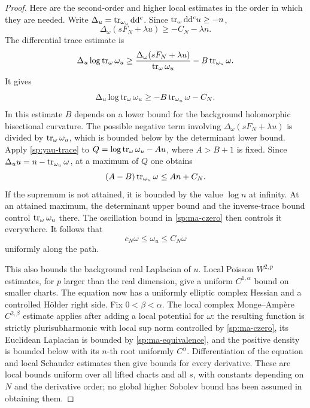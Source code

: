 \begin{proof}
Here are the second-order and higher local estimates in the order in
which they are needed.  Write $\Delta_u=\operatorname{tr}_{\omega_u}\mathrm d\mathrm d^c$.
Since $\operatorname{tr}_\omega\mathrm d\mathrm d^c u\ge-n$,
\[
 \Delta_\omega(sF_N+\lambda u)\ge-C_N-\lambda n.
\]
The differential trace estimate
\cite[Lemma~2.2]{CampanaGuenanciaPaun2013} is
\[
 \Delta_u\log\operatorname{tr}_\omega\omega_u
 \ge\frac{\Delta_\omega(sF_N+\lambda u)}
            {\operatorname{tr}_\omega\omega_u}
       -B\operatorname{tr}_{\omega_u}\omega.
\]
It gives
\begin{equation}\label{sp:yau-trace}
 \Delta_u\log\operatorname{tr}_\omega\omega_u
 \ge-B\operatorname{tr}_{\omega_u}\omega-C_N.
\end{equation}
In this estimate $B$ depends on a lower bound for the background
holomorphic bisectional curvature.  The possible negative term involving
$\Delta_\omega(sF_N+\lambda u)$ is divided by
$\operatorname{tr}_\omega\omega_u$, which is bounded below by the determinant lower
bound.
Apply \eqref{sp:yau-trace} to
$Q=\log\operatorname{tr}_\omega\omega_u-Au$, where $A>B+1$ is fixed.  Since
$\Delta_u u=n-\operatorname{tr}_{\omega_u}\omega$, at a maximum of $Q$ one obtains
\[
 (A-B)\operatorname{tr}_{\omega_u}\omega\le An+C_N.
\]
If the supremum is not attained, it is bounded by the value $\log n$ at
infinity.  At an attained maximum, the determinant upper bound and the
inverse-trace bound control $\operatorname{tr}_\omega\omega_u$ there.  The oscillation
bound in \eqref{sp:ma-czero} then controls it everywhere.  It follows that
\begin{equation}\label{sp:ma-equivalence}
 c_N\omega\le\omega_u\le C_N\omega
\end{equation}
uniformly along the path.

This also bounds the background real Laplacian of $u$.  Local Poisson
$W^{2,p}$ estimates, for $p$ larger than the real dimension, give a
uniform $C^{1,\alpha}$ bound on smaller charts.  The equation now has a
uniformly elliptic complex Hessian and a controlled H\"older right side.
Fix $0<\beta<\alpha$.  The local complex Monge--Amp\`ere
$C^{2,\beta}$ estimate
\cite[arXiv:1111.0902v1, Theorem~1.1]{YuWang2012} applies after adding
a local potential for $\omega$: the resulting function is strictly
plurisubharmonic with local sup norm controlled by \eqref{sp:ma-czero},
its Euclidean Laplacian is bounded by \eqref{sp:ma-equivalence}, and
the positive density is bounded below with its $n$-th root uniformly
$C^\alpha$.  Differentiation of the equation and local Schauder
estimates then give bounds for every derivative.  These are local bounds
uniform over all lifted charts and
all $s$, with constants depending on $N$ and the derivative order; no
global higher Sobolev bound has been assumed in obtaining them.


\end{proof}
